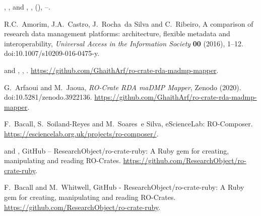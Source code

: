 \documentclass[ds,v1.1.2,openaccess]{iosart2x}%
\begin{document}
\begin{thebibliography}{}
%
\begin{barticle}
,
,
 and
,
,
(),
--.
\end{barticle}
%
\OrigBibText
R.C.~Amorim,
J.A.~Castro,
J.~Rocha~da Silva and
C.~Ribeiro,
A comparison of research data management platforms: architecture, flexible
metadata and interoperability,
\textit{Universal Access in the Information Society}
\textbf{00}
(2016),
1--12.
doi:10.1007/s10209-016-0475-y.
\endOrigBibText
{}
\endbibitem

%
\begin{bbook}
 and
,
,
.
\url{https://github.com/GhaithArf/ro-crate-rda-madmp-mapper}.
\end{bbook}
%
\OrigBibText
G.~Arfaoui and
M.~Jaoua,
\textit{{RO}-Crate {RDA} {maDMP} Mapper},
Zenodo
(2020).
doi:10.5281/zenodo.3922136.
\url{https://github.com/GhaithArf/ro-crate-rda-madmp-mapper}.
\endOrigBibText
{}
\endbibitem

%
%
\OrigBibText
F.~Bacall,
S.~Soiland-Reyes and
M.~Soares~e Silva,
eScienceLab: RO-Composer.
\url{https://esciencelab.org.uk/projects/ro-composer/}.
\endOrigBibText
{}
\endbibitem

%
\begin{botherref}
 and
,
{GitHub} -- {ResearchObject}/ro-crate-ruby: A Ruby gem for creating,
manipulating and reading {RO}-Crates.
\url{https://github.com/ResearchObject/ro-crate-ruby}.
\end{botherref}
%
\OrigBibText
F.~Bacall and
M.~Whitwell,
{GitHub} - {ResearchObject}/ro-crate-ruby: A Ruby gem for creating,
manipulating and reading {RO}-Crates.
\url{https://github.com/ResearchObject/ro-crate-ruby}.
\endOrigBibText
{}
\endbibitem


\end{thebibliography}
\end{document}
